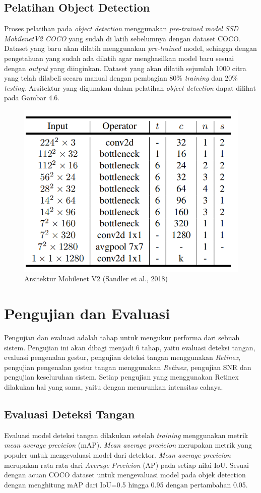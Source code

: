 \subsection{Pelatihan Object Detection}
Proses pelatihan pada \emph{object detection} menggunakan \emph{pre-trained model SSD MobilenetV2 COCO} yang sudah di latih sebelumnya dengan dataset COCO.
Dataset yang baru akan dilatih menggunakan \emph{pre-trained} model, sehingga dengan pengetahuan yang sudah ada dilatih agar menghasilkan model baru sesuai dengan \emph{output} yang diinginkan. 
Dataset yang akan dilatih sejumlah 1000 citra yang telah dilabeli secara manual dengan pembagian 80\% \emph{training} dan 20\% \emph{testing}.
Arsitektur yang digunakan dalam pelatihan \emph{object detection} dapat dilihat pada Gambar 4.6.
\begin{figure}[H]
	\centering
	\includegraphics[width=0.7\linewidth]{"v2"}
	\caption{Arsitektur Mobilenet V2 (Sandler et al., 2018)}
	\label{fig:v2}
\end{figure}
\section{Pengujian dan Evaluasi}
Pengujian dan evaluasi adalah tahap untuk mengukur performa dari sebuah sistem. Pengujian ini akan dibagi menjadi 6 tahap, yaitu evaluasi deteksi tangan, evaluasi pengenalan gestur, pengujian deteksi tangan menggunakan \emph{Retinex}, pengujian pengenalan gestur tangan menggunakan \emph{Retinex}, pengujian SNR dan pengujian keseluruhan sistem. 
Setiap pengujian yang menggunakan Retinex dilakukan hal yang sama, yaitu dengan menurunkan intensitas cahaya.
\subsection{Evaluasi Deteksi Tangan}
Evaluasi model deteksi tangan dilakukan setelah \emph{training} menggunakan metrik \emph{mean average precicion} (mAP). \emph{Mean average precicion} merupakan metrik yang populer untuk mengevaluasi model dari detektor. \emph{Mean average precicion} merupakan rata rata dari \emph{Average Precicion} (AP) pada setiap nilai IoU. Sesuai dengan acuan COCO dataset untuk mengevaluasi model pada objek detection dengan menghitung mAP dari IoU=0.5 hingga 0.95 dengan pertambahan 0.05.
